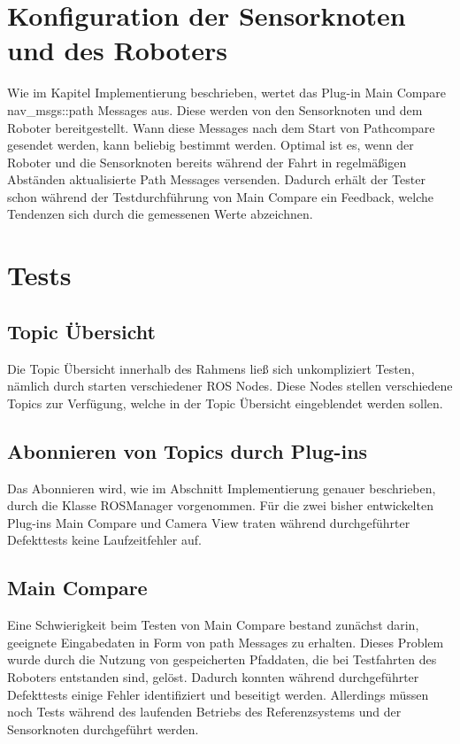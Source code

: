 \section{Konfiguration der Sensorknoten und des Roboters}

Wie im Kapitel Implementierung beschrieben, wertet das Plug-in Main Compare
nav\_msgs::path Messages aus. Diese werden von den Sensorknoten und dem Roboter
bereitgestellt. Wann diese Messages nach dem Start von Pathcompare gesendet
werden, kann beliebig bestimmt werden. Optimal ist es, wenn der Roboter
und die Sensorknoten bereits während der Fahrt in regelmäßigen Abständen
aktualisierte Path Messages versenden.  Dadurch erhält der Tester schon
während der Testdurchführung von Main Compare ein Feedback, welche Tendenzen
sich durch die gemessenen Werte abzeichnen.

\section{Tests}

\subsection{Topic Übersicht}
Die Topic Übersicht innerhalb des Rahmens ließ sich unkompliziert Testen, nämlich durch
starten verschiedener ROS Nodes. Diese Nodes stellen verschiedene Topics zur
Verfügung, welche in der Topic Übersicht eingeblendet werden sollen.

\subsection{Abonnieren von Topics durch Plug-ins}
Das Abonnieren wird, wie im Abschnitt Implementierung genauer beschrieben, durch die
Klasse ROSManager vorgenommen. Für die zwei bisher entwickelten Plug-ins Main
Compare und Camera View traten während durchgeführter Defekttests keine
Laufzeitfehler auf.

\subsection{Main Compare}
Eine Schwierigkeit beim Testen von Main Compare bestand zunächst darin,
geeignete Eingabedaten in Form von path Messages zu erhalten. 
Dieses Problem wurde durch die Nutzung von gespeicherten Pfaddaten, die bei Testfahrten des
Roboters entstanden sind, gelöst. 
Dadurch konnten während durchgeführter Defekttests einige Fehler
identifiziert und beseitigt werden. Allerdings müssen noch Tests während des
laufenden Betriebs des Referenzsystems und der Sensorknoten durchgeführt werden.


